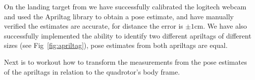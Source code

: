 \documentclass[11pt, twocolumn]{article}
\begin{document}
On the landing target from we have successfully calibrated the logitech webcam and used the Apriltag library to obtain a pose estimate, and have manually verified the estimates are accurate, for distance the error is $\pm 1$cm. We have also successfully implemented the ability to identify two different apriltags of different sizes (see Fig~\ref{fig:apriltag}), pose estimates from both apriltags are equal.

Next is to workout how to transform the measurements from the pose estimates of the apriltags in relation to the quadrotor's body frame.







{}

\end{document}
